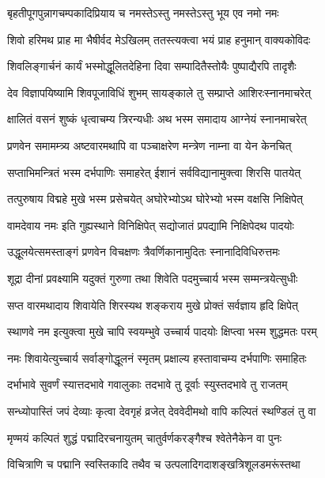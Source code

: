 \twolineshloka
{बृहतीपूगपुन्नागचम्पकादिप्रियाय च}
{नमस्तेऽस्तु नमस्तेऽस्तु भूय एव नमो नमः}%

\twolineshloka
{शिवो हरिमथ प्राह मा भैषीर्वद मेऽखिलम्}
{ततस्त्यक्त्वा भयं प्राह हनुमान् वाक्यकोविदः}%

\twolineshloka
{शिवलिङ्गार्चनं कार्यं भस्मोद्धूलितदेहिना}
{दिवा सम्पादितैस्तोयैः पुष्पाद्यैरपि तादृशैः}%

\twolineshloka
{देव विज्ञापयिष्यामि शिवपूजाविधिं शुभम्}
{सायङ्काले तु सम्प्राप्ते आशिरःस्नानमाचरेत्}%

\twolineshloka
{क्षालितं वसनं शुष्कं धृत्वाचम्य त्रिरन्यधीः}
{अथ भस्म समादाय आग्नेयं स्नानमाचरेत्}%

\twolineshloka
{प्रणवेन समामम्त्र्य अष्टवारमथापि वा}
{पञ्चाक्षरेण मन्त्रेण नाम्ना वा येन केनचित्}%

\twolineshloka
{सप्ताभिमन्त्रितं भस्म दर्भपाणिः समाहरेत्}
{ईशानं सर्वविद्यानामुक्त्वा शिरसि पातयेत्}%

\twolineshloka
{तत्पुरुषाय विद्महे मुखे भस्म प्रसेचयेत्}
{अघोरेभ्योऽथ घोरेभ्यो भस्म वक्षसि निक्षिपेत्}%

\twolineshloka
{वामदेवाय नमः इति गुह्यस्थाने विनिक्षिपेत्}
{सद्योजातं प्रपद्यामि निक्षिपेदथ पादयोः}%

\twolineshloka
{उद्धूलयेत्समस्ताङ्गं प्रणवेन विचक्षणः}
{त्रैवर्णिकानामुदितः स्नानादिविधिरुत्तमः}%

\twolineshloka
{शूद्रा दीनां प्रवक्ष्यामि यदुक्तं गुरुणा तथा}
{शिवेति पदमुच्चार्य भस्म सम्मन्त्रयेत्सुधीः}%

\twolineshloka
{सप्त वारमथादाय शिवायेति शिरस्यथ}
{शङ्कराय मुखे प्रोक्तं सर्वज्ञाय हृदि क्षिपेत्}%

\twolineshloka
{स्थाणवे नम इत्युक्त्वा मुखे चापि स्वयम्भुवे}
{उच्चार्य पादयोः क्षिप्त्वा भस्म शुद्धमतः परम्}%

\twolineshloka
{नमः शिवायेत्युच्चार्य सर्वाङ्गोद्धूलनं स्मृतम्}
{प्रक्षाल्य हस्तावाचम्य दर्भपाणिः समाहितः}%

\twolineshloka
{दर्भाभावे सुवर्णं स्यात्तदभावे गवालुकाः}
{तदभावे तु दूर्वाः स्युस्तदभावे तु राजतम्}%

\twolineshloka
{सन्ध्योपास्तिं जपं देव्याः कृत्वा देवगृहं व्रजेत्}
{देववेदीमथो वापि कल्पितं स्थण्डिलं तु वा}%

\twolineshloka
{मृण्मयं कल्पितं शुद्धं पद्मादिरचनायुतम्}
{चातुर्वर्णकरङ्गैश्च श्वेतेनैकेन वा पुनः}%

\twolineshloka
{विचित्राणि च पद्मानि स्वस्तिकादि तथैव च}
{उत्पलादिगदाशङ्खत्रिशूलडमरूंस्तथा}%

